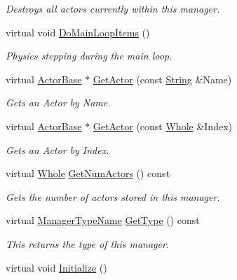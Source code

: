 \begin{DoxyCompactItemize}
\begin{DoxyCompactList}\small\item\em Destroys all actors currently within this manager. \item\end{DoxyCompactList}\item 
virtual void \hyperlink{classMezzanine_1_1ActorManager_a8b1907afd4804047c03ff4bb51c89caa}{DoMainLoopItems} ()
\begin{DoxyCompactList}\small\item\em Physics stepping during the main loop. \item\end{DoxyCompactList}\item 
virtual \hyperlink{classMezzanine_1_1ActorBase}{ActorBase} $\ast$ \hyperlink{classMezzanine_1_1ActorManager_a9657cdc7c0cef46a172ad73f366e4199}{GetActor} (const \hyperlink{namespaceMezzanine_acf9fcc130e6ebf08e3d8491aebcf1c86}{String} \&Name)
\begin{DoxyCompactList}\small\item\em Gets an Actor by Name. \item\end{DoxyCompactList}\item 
virtual \hyperlink{classMezzanine_1_1ActorBase}{ActorBase} $\ast$ \hyperlink{classMezzanine_1_1ActorManager_a71e61da8caf365ae03dd85090245b1ae}{GetActor} (const \hyperlink{namespaceMezzanine_adcbb6ce6d1eb4379d109e51171e2e493}{Whole} \&Index)
\begin{DoxyCompactList}\small\item\em Gets an Actor by Index. \item\end{DoxyCompactList}\item 
virtual \hyperlink{namespaceMezzanine_adcbb6ce6d1eb4379d109e51171e2e493}{Whole} \hyperlink{classMezzanine_1_1ActorManager_ab5bee94dfa8c103b2bb9ace4f9ab20fc}{GetNumActors} () const 
\begin{DoxyCompactList}\small\item\em Gets the number of actors stored in this manager. \item\end{DoxyCompactList}\item 
virtual \hyperlink{classMezzanine_1_1ManagerBase_a08cecf5169cad3e82be81a3a159b0b6e}{ManagerTypeName} \hyperlink{classMezzanine_1_1ActorManager_abfd167e1e15f32dffed05a2bd1b4ac70}{GetType} () const 
\begin{DoxyCompactList}\small\item\em This returns the type of this manager. \item\end{DoxyCompactList}\item 
\hypertarget{classMezzanine_1_1ActorManager_a3b5b383066473d09243d13ad702c4868}{
virtual void \hyperlink{classMezzanine_1_1ActorManager_a3b5b383066473d09243d13ad702c4868}{Initialize} ()}
\label{classMezzanine_1_1ActorManager_a3b5b383066473d09243d13ad702c4868}


\end{DoxyCompactItemize}
